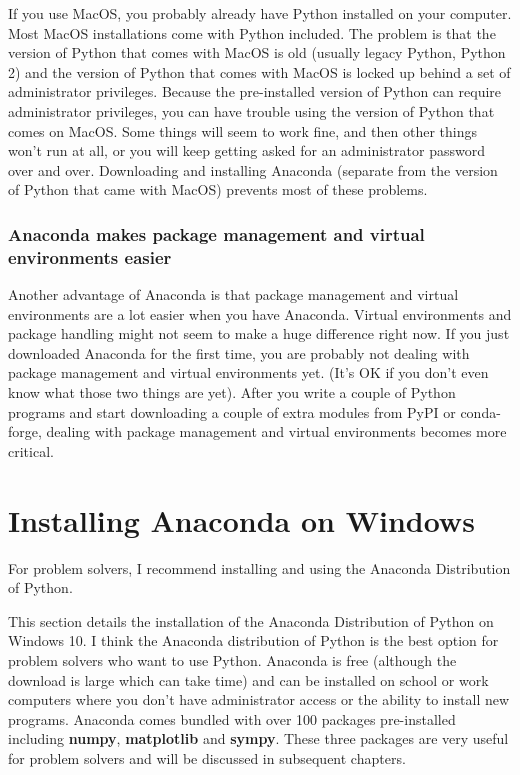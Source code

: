 \documentclass{book}
\begin{document}
If you use MacOS, you probably already have Python installed on your
computer. Most MacOS installations come with Python included. The
problem is that the version of Python that comes with MacOS is old
(usually legacy Python, Python 2) and the version of Python that comes
with MacOS is locked up behind a set of administrator privileges.
Because the pre-installed version of Python can require administrator
privileges, you can have trouble using the version of Python that comes
on MacOS. Some things will seem to work fine, and then other things
won't run at all, or you will keep getting asked for an administrator
password over and over. Downloading and installing Anaconda (separate
from the version of Python that came with MacOS) prevents most of these
problems.

\subsubsection{Anaconda makes package management and virtual
environments
easier}\label{anaconda-makes-package-management-and-virtual-environments-easier}

Another advantage of Anaconda is that package management and virtual
environments are a lot easier when you have Anaconda. Virtual
environments and package handling might not seem to make a huge
difference right now. If you just downloaded Anaconda for the first
time, you are probably not dealing with package management and virtual
environments yet. (It's OK if you don't even know what those two things
are yet). After you write a couple of Python programs and start
downloading a couple of extra modules from PyPI or conda-forge, dealing
with package management and virtual environments becomes more critical.
    




    
        \section{Installing Anaconda on
Windows}\label{installing-anaconda-on-windows}
    




    
        For problem solvers, I recommend installing and using the Anaconda
Distribution of Python.
    




    
        This section details the installation of the Anaconda Distribution of
Python on Windows 10. I think the Anaconda distribution of Python is the
best option for problem solvers who want to use Python. Anaconda is free
(although the download is large which can take time) and can be
installed on school or work computers where you don't have administrator
access or the ability to install new programs. Anaconda comes bundled
with over 100 packages pre-installed including \textbf{numpy},
\textbf{matplotlib} and \textbf{sympy}. These three packages are very
useful for problem solvers and will be discussed in subsequent chapters.
\end{document}
